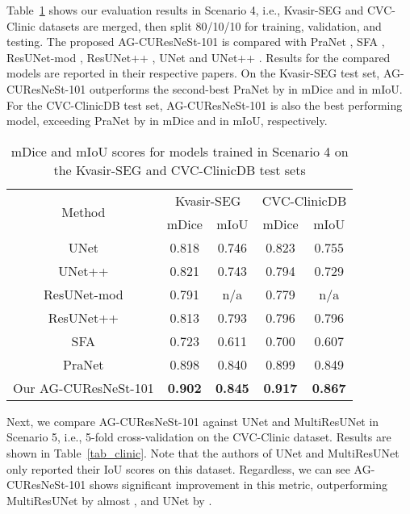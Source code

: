 \documentclass[review, sort&compress]{elsarticle}
\begin{document}
	Table~\ref{tab_kvasir_clinic} shows our evaluation results in Scenario 4, i.e., Kvasir-SEG and CVC-Clinic datasets are merged, then split 80/10/10 for training, validation, and testing. The proposed AG-CUResNeSt-101 is compared with PraNet \cite{fan2020pranet}, SFA \cite{fang2019selective}, ResUNet-mod \cite{zhang2018road}, ResUNet++ \cite{jha2019resunet++}, UNet \cite{ronneberger2015u} and UNet++ \cite{zhou2019unet++}. Results for the compared models are reported in their respective papers. On the Kvasir-SEG test set, AG-CUResNeSt-101 outperforms the second-best PraNet by  in mDice and  in mIoU. For the CVC-ClinicDB test set, AG-CUResNeSt-101 is also the best performing model, exceeding PraNet by   in mDice and  in mIoU, respectively.
	
	\begin{table} [ht!]
		\centering
		\caption{mDice and mIoU scores for models trained in Scenario 4 on the Kvasir-SEG and CVC-ClinicDB test sets}
		\begin{tabular}{c|c c | c c}
			\hline
			\multirow{2}{*}{Method}               & \multicolumn{2}{c|}{Kvasir-SEG}  & \multicolumn{2}{c}{CVC-ClinicDB}   \\
			\cline{2-3} \cline{4-5} 
			& mDice  & mIoU  & mDice  & mIoU   \\
			\hline
			\hline
			
			UNet  \cite{ronneberger2015u}     & 0.818  & 0.746 & 0.823  & 0.755  \\
			UNet++  \cite{zhou2019unet++}      & 0.821  & 0.743 & 0.794  & 0.729  \\
			ResUNet-mod  \cite{zhang2018road}          & 0.791  & n/a   & 0.779  & n/a    \\
			ResUNet++ \cite{jha2019resunet++}             & 0.813  & 0.793  & 0.796  & 0.796  \\
			SFA \cite{fang2019selective}       & 0.723  & 0.611   & 0.700  & 0.607 \\
			PraNet  \cite{fan2020pranet}               & 0.898  & 0.840   & 0.899  & 0.849 \\
			\hline
			\hline
			Our AG-CUResNeSt-101 & \textbf{0.902} & \textbf{0.845}  & \textbf{0.917}  & \textbf{0.867} \\
			\hline
		\end{tabular}
		\label{tab_kvasir_clinic}
	\end{table}
	
	Next, we compare AG-CUResNeSt-101 against UNet and MultiResUNet \cite{ibtehaz2020multiresunet} in Scenario 5, i.e., 5-fold cross-validation on the CVC-Clinic dataset. Results are shown in Table~\ref{tab_clinic}. Note that the authors of UNet and MultiResUNet only reported their IoU scores on this dataset. Regardless, we can see AG-CUResNeSt-101 shows significant improvement in this metric, outperforming MultiResUNet by almost , and UNet by .
	
\end{document}
